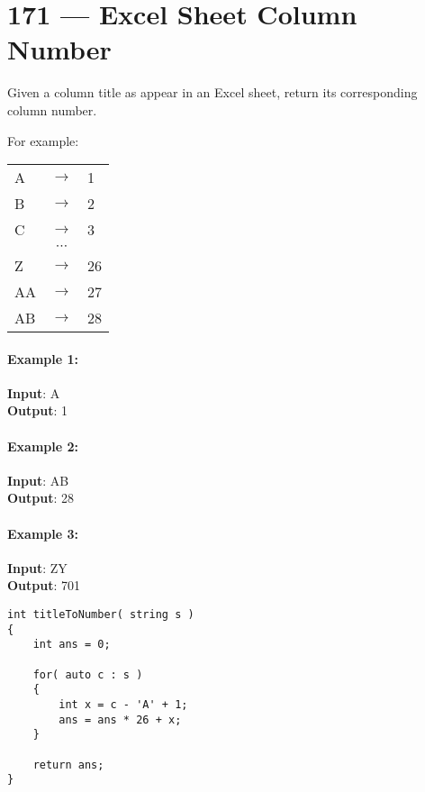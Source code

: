 \section{171 --- Excel Sheet Column Number}
Given a column title as appear in an Excel sheet, return its corresponding column number.
\par
For example:
\begin{table}[H]
\begin{tabular}{lcl}
A & $\to$ & 1 \\
B & $\to$ & 2 \\
C & $\to$ & 3 \\
 & $\cdots$ & \\
Z & $\to$ & 26  \\
AA & $\to$ &27  \\
AB & $\to$ &28  
\end{tabular}
\end{table}
\paragraph{Example 1:}
\begin{flushleft}
\textbf{Input}: A
\\
\textbf{Output}: 1
\end{flushleft}
\paragraph{Example 2:}
\begin{flushleft}
\textbf{Input}: AB
\\
\textbf{Output}: 28
\end{flushleft}
\paragraph{Example 3:}
\begin{flushleft}
\textbf{Input}: ZY
\\
\textbf{Output}: 701
\end{flushleft}
\begin{lstlisting}[style=customc]
int titleToNumber( string s )
{
    int ans = 0;

    for( auto c : s )
    {
        int x = c - 'A' + 1;
        ans = ans * 26 + x;
    }

    return ans;
}
\end{lstlisting}